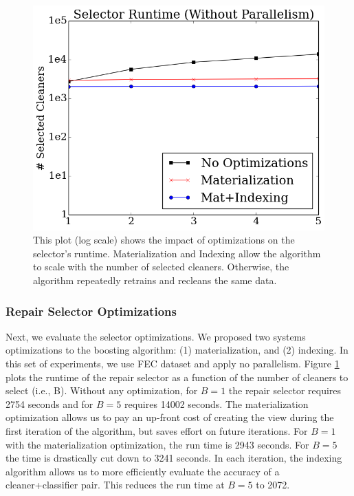  \begin{figure}[t]
\centering
 \includegraphics[width=0.8\columnwidth]{exp/opt1.png}
 \caption{This plot (log scale) shows the impact of optimizations on the selector's runtime. Materialization and Indexing allow the algorithm to scale with the number of selected cleaners. Otherwise, the algorithm repeatedly retrains and recleans the same data.
 \label{fig:opt}}
\end{figure}
 
 \subsubsection{Repair Selector Optimizations}
 Next, we evaluate the selector optimizations. We proposed two systems optimizations to the boosting algorithm: (1) materialization, and (2) indexing.
 In this set of experiments, we use FEC dataset and apply no parallelism.
 Figure \ref{fig:opt} plots the runtime of the repair selector as a function of the number of cleaners to select (i.e., B).
 Without any optimization, for $B=1$ the repair selector requires 2754 seconds and for $B=5$ requires 14002 seconds.
 The materialization optimization allows us to pay an up-front cost of creating the view during the first iteration of the algorithm, but saves effort on future iterations.
 For $B=1$ with the materialization optimization, the run time is 2943 seconds.
 For $B=5$ the time is drastically cut down to 3241 seconds.
 In each iteration, the indexing algorithm allows us to more efficiently evaluate the accuracy of a cleaner+classifier pair.
 This reduces the run time at $B=5$ to 2072.
 
